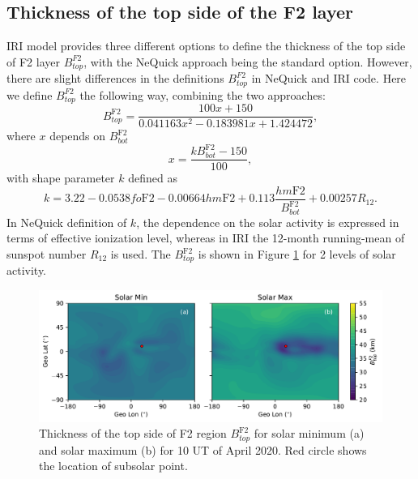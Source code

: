 \documentclass[draft]{agujournal2019}
\begin{document}
\subsection{Thickness of the top side of the F2 layer} 
IRI model provides three different options to define the thickness of the top side of F2 layer $B^{F2}_{top}$, with the NeQuick approach being the standard option. However, there are slight differences in the definitions $B^{F2}_{top}$ in NeQuick and IRI code. Here we define $B^{F2}_{top}$ the following way, combining the two approaches: 
\begin{equation}\label{eqn:B_F2_top}
B^{\mathrm{F2}}_{top}=\frac{100x+150}{0.041163x^2-0.183981x+1.424472},
\end{equation}
where $x$ depends on $B^{\mathrm{F2}}_{bot}$
\begin{equation}\label{eqn:x}
x=\frac{k B^{\mathrm{F2}}_{bot}-150}{100},
\end{equation}
with shape parameter $k$ defined as
\begin{equation}\label{eqn:k}
k=3.22-0.0538 fo\mathrm{F2}-0.00664 hm\mathrm{F2} +0.113 \frac{hm\mathrm{F2}}{B^{\mathrm{F2}}_{bot}}+0.00257 R_{12}.
\end{equation}
In NeQuick definition of $k$, the dependence on the solar activity is expressed in terms of effective ionization level, whereas in IRI the 12-month running-mean of sunspot number $R_{12}$ is used.
The $B^{\mathrm{F2}}_{top}$ is shown in Figure \ref{fig:BF2_top_min_max} for 2 levels of solar activity.

\begin{figure}[H]
  \includegraphics[scale=0.7]{PyIRI_B_F2_top_min_max.pdf}
  \caption{Thickness of the top side of F2 region $B^{\mathrm{F2}}_{top}$ for solar minimum (a) and solar maximum (b) for 10 UT of April 2020. Red circle shows the location of subsolar point.}
  \label{fig:BF2_top_min_max}
\end{figure}

\end{document}
